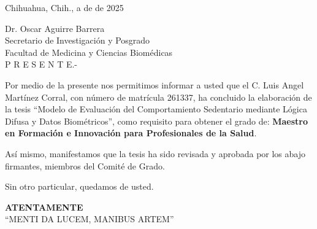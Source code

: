 \documentclass[12pt,letterpaper,oneside]{report}
\begin{document}
\begin{flushright}
{\fontsize{12}{14}\selectfont Chihuahua, Chih., a \underline{\hspace{1.5cm}} de \underline{\hspace{1.5cm}} de 2025}\\[0.3cm]
\end{flushright}

\noindent
{\fontsize{12}{14}\selectfont 
Dr. Oscar Aguirre Barrera\\[0.1cm]
Secretario de Investigaci\'on y Posgrado\\[0.1cm]
Facultad de Medicina y Ciencias Biom\'edicas\\[0.3cm]

P {\hspace{0.15cm}} R {\hspace{0.15cm}} E {\hspace{0.15cm}} S {\hspace{0.15cm}} E {\hspace{0.15cm}} N {\hspace{0.15cm}} T {\hspace{0.15cm}} E.-\\[0.3cm]
}

{\fontsize{12}{14}\selectfont
\setlength{\parindent}{0cm}   %
\setlength{\parskip}{0.2cm}   %

\noindent Por medio de la presente nos permitimos informar a usted que el C. Luis Angel Mart\'inez Corral, con n\'umero de matr\'icula 261337, ha concluido la elaboraci\'on de la tesis ``Modelo de Evaluaci\'on del Comportamiento Sedentario mediante L\'ogica Difusa y Datos Biom\'etricos'', como requisito para obtener el grado de: \textbf{Maestro en Formaci\'on e Innovaci\'on para Profesionales de la Salud}.

As\'i mismo, manifestamos que la tesis ha sido revisada y aprobada por los abajo firmantes, miembros del Comit\'e de Grado.

Sin otro particular, quedamos de usted.

}

\begin{center}
{\fontsize{12}{14}\selectfont\bfseries ATENTAMENTE}\\[0.3cm]
{\fontsize{12}{14}\selectfont ``MENTI DA LUCEM, MANIBUS ARTEM''}\\[0.5cm]
\end{center}
\end{document}
